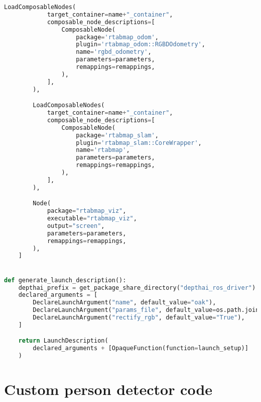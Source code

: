 \begin{lstlisting}[language=python,frame=single]
        LoadComposableNodes(
            target_container=name+"_container",
            composable_node_descriptions=[
                ComposableNode(
                    package='rtabmap_odom',
                    plugin='rtabmap_odom::RGBDOdometry',
                    name='rgbd_odometry',
                    parameters=parameters,
                    remappings=remappings,
                ),
            ],
        ),

        LoadComposableNodes(
            target_container=name+"_container",
            composable_node_descriptions=[
                ComposableNode(
                    package='rtabmap_slam',
                    plugin='rtabmap_slam::CoreWrapper',
                    name='rtabmap',
                    parameters=parameters,
                    remappings=remappings,
                ),
            ],
        ),

        Node(
            package="rtabmap_viz",
            executable="rtabmap_viz",
            output="screen",
            parameters=parameters,
            remappings=remappings,
        ),
    ]


def generate_launch_description():
    depthai_prefix = get_package_share_directory("depthai_ros_driver")
    declared_arguments = [
        DeclareLaunchArgument("name", default_value="oak"),
        DeclareLaunchArgument("params_file", default_value=os.path.join(depthai_prefix, 'config', 'rgbd.yaml')),
        DeclareLaunchArgument("rectify_rgb", default_value="True"),
    ]

    return LaunchDescription(
        declared_arguments + [OpaqueFunction(function=launch_setup)]
    )

\end{lstlisting}

\section{Custom person detector code} \label{custom_person_detector}

